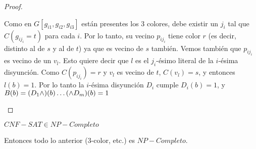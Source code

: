 \begin{proof}
\begin{enumerate}
    Como en $G[g_{i1},g_{i2},g_{i3}]$ están presentes los 3 colores, debe existir un $j_i$ tal que $C(g_{ij_i} = t)$ para cada $i$. Por lo tanto, su vecino $p_{ij_i}$ tiene color $r$ (es decir, distinto al de $s$ y al de $t$) ya que es vecino de $s$ también. Vemos también que $p_{ij_i}$ es vecino de un $v_l$. Esto quiere decir que $l$ es el $j_i$-ésimo literal de la $i$-ésima disyunción. Como $C(p_{ij_i}) = r$ y $v_l$ es vecino de $t$, $C(v_l) = s$, y entonces $l(b) = 1$. Por lo tanto la $i$-ésima disyunción $D_i$ cumple $D_i(b) = 1$, y $B(b) = (D_1 \wedge)(b) \mathellipsis (\wedge D_m)(b) = 1$
    \end{enumerate}
\end{proof}

\begin{theorem}[Cook, 1973]
$CNF-SAT \in NP-Completo$
\end{theorem}

Entonces todo lo anterior (3-color, etc.) es $NP-Completo$.
